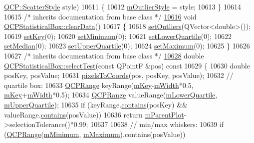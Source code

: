 \begin{DoxyCode}
      \hyperlink{a00143_af66d0711d42fe78d96c28abadc67f26f}{QCP::ScatterStyle} style)
10611 \{
10612   \hyperlink{a00050_abf80fa499e29db8995bcf7f4be28bb5c}{mOutlierStyle} = style;
10613 \}
10614 
10615 \textcolor{comment}{/* inherits documentation from base class */}
\hypertarget{a00115_source_l10616}{}\hyperlink{a00050_a19112994449df0c20287858436cc68e3}{10616} \textcolor{keywordtype}{void} \hyperlink{a00050_a19112994449df0c20287858436cc68e3}{QCPStatisticalBox::clearData}()
10617 \{
10618   \hyperlink{a00050_af9bc09620e0bf93bf444ee35e5800d1d}{setOutliers}(QVector<double>());
10619   \hyperlink{a00050_a84a1c6d34b2f9af40bca0c527d51e97e}{setKey}(0);
10620   \hyperlink{a00050_a84ff7cc61ba44890f0c3e0c99c19941e}{setMinimum}(0);
10621   \hyperlink{a00050_a680941af5e23d902013962fa67223f9e}{setLowerQuartile}(0);
10622   \hyperlink{a00050_a65970e77a897da4ecb4b15300868aad3}{setMedian}(0);
10623   \hyperlink{a00050_a65a1375f941c5a2077b5201229e89346}{setUpperQuartile}(0);
10624   \hyperlink{a00050_acec5ad1901f00f2c5387cfb4d9787eb3}{setMaximum}(0);
10625 \}
10626 
10627 \textcolor{comment}{/* inherits documentation from base class */}
\hypertarget{a00115_source_l10628}{}\hyperlink{a00050_acf75fbec885886546ae11ca194ad2aec}{10628} \textcolor{keywordtype}{double} \hyperlink{a00050_acf75fbec885886546ae11ca194ad2aec}{QCPStatisticalBox::selectTest}(\textcolor{keyword}{const} QPointF &pos)\textcolor{keyword}{ const}
10629 \textcolor{keyword}{}\{
10630   \textcolor{keywordtype}{double} posKey, posValue;
10631   \hyperlink{a00024_a10408828446e9e0681c46d65120f382e}{pixelsToCoords}(pos, posKey, posValue);
10632   \textcolor{comment}{// quartile box:}
10633   \hyperlink{a00049}{QCPRange} keyRange(\hyperlink{a00050_a86fd1d3be5c5bc11d11eda7517069af4}{mKey}-\hyperlink{a00050_af365e40b0f706c3d76f857c7957f629d}{mWidth}*0.5, \hyperlink{a00050_a86fd1d3be5c5bc11d11eda7517069af4}{mKey}+\hyperlink{a00050_af365e40b0f706c3d76f857c7957f629d}{mWidth}*0.5);
10634   \hyperlink{a00049}{QCPRange} valueRange(\hyperlink{a00050_acac86cac93d9fa3d820b5aaa04ed96f6}{mLowerQuartile}, \hyperlink{a00050_a865afbcca332ee851aa45807381bc80e}{mUpperQuartile});
10635   \textcolor{keywordflow}{if} (keyRange.\hyperlink{a00049_a030ce95b527c32e01414d0351347b46d}{contains}(posKey) && valueRange.\hyperlink{a00049_a030ce95b527c32e01414d0351347b46d}{contains}(posValue))
10636     \textcolor{keywordflow}{return} \hyperlink{a00044_aa2a528433e44db02b8aef23c1f9f90ed}{mParentPlot}->selectionTolerance()*0.99;
10637   
10638   \textcolor{comment}{// min/max whiskers:}
10639   \textcolor{keywordflow}{if} (\hyperlink{a00049}{QCPRange}(\hyperlink{a00050_a7143ece4e7e5f9ac010739fbc390bf0c}{mMinimum}, \hyperlink{a00050_a16266f1e0e4e8e95b5d141c49479ef2e}{mMaximum}).contains(posValue))

\end{DoxyCode}
